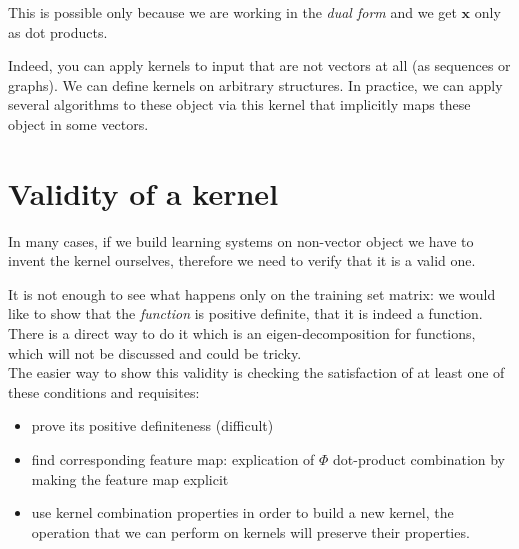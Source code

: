 This is possible only because we are working in the \textit{dual form} and we get
$\pmb{x}$ only as dot products.

Indeed, you can apply kernels to input that are not vectors at all (as sequences
or graphs). We can define kernels on arbitrary structures. In practice, we can
apply several algorithms to these object via this kernel that implicitly maps
these object in some vectors.

\section{Validity of a kernel}
In many cases, if we build learning systems on non-vector object we have to invent
the kernel ourselves, therefore we need to verify that it is a valid one.



It is not enough to see what happens only on the training set matrix: we would like
to show that the \textit{function} is positive definite, that it is indeed a function.
There is a direct way to do it which is an eigen-decomposition for functions, which
will not be discussed and could be tricky.\\

The easier way to show this validity is checking the satisfaction of at least
one of these conditions and requisites:
\begin{itemize}
	\item prove its positive definiteness (difficult)

	\item find corresponding feature map: explication of $\Phi$ dot-product
		combination by making the feature map explicit

	\item use kernel combination properties in order to build a new kernel, the
		operation that we can perform on kernels will preserve their properties.
\end{itemize}

